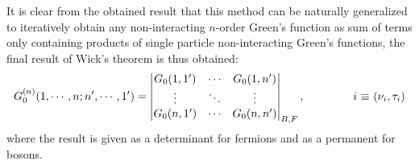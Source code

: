 \documentclass[12pt, a4paper]{report}
\numberwithin{equation}{section}
\begin{document}
It is clear from the obtained result that this method can be naturally generalized to iteratively obtain any non-interacting $n$-order Green's function as sum of terms only 
containing products of single particle non-interacting Green's functions, the final result of Wick's theorem is thus obtained:
\begin{equation}
    G_0^{(n)}(1,\cdots,n;n',\cdots,1')=\begin{vmatrix}
        G_0(1,1') & \cdots & G_0(1,n') \\
        \vdots & \ddots & \vdots \\
        G_0(n,1') & \cdots & G_0(n,n') \\
    \end{vmatrix}_{B,F},\hspace{1.5cm}\text{$i$ $\equiv$ $(\nu_i,\tau_i)$}
\end{equation}
where the result is given as a determinant for fermions and as a permanent for bosons.
\end{document}

